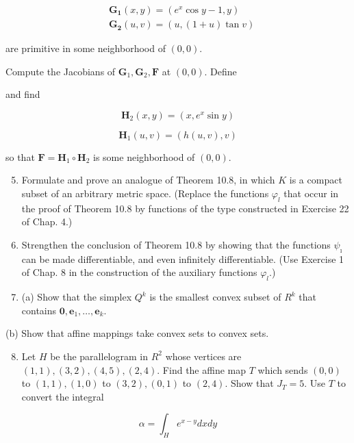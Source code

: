 \documentclass[10pt]{article}
\begin{document}
$$
\begin{aligned}
& \mathbf{G}_{\mathbf{1}}(x, y)=\left(e^{x} \cos y-1, y\right) \\
& \mathbf{G}_{\mathbf{2}}(u, v)=(u,(1+u) \tan v)
\end{aligned}
$$

are primitive in some neighborhood of $(0,0)$.

Compute the Jacobians of $\mathbf{G}_{1}, \mathbf{G}_{2}, \mathbf{F}$ at $(0,0)$. Define

and find

$$
\mathbf{H}_{2}(x, y)=\left(x, e^{x} \sin y\right)
$$

$$
\mathbf{H}_{1}(u, v)=(h(u, v), v)
$$

so that $\mathbf{F}=\mathbf{H}_{1} \circ \mathbf{H}_{2}$ is some neighborhood of $(0,0)$.

\begin{enumerate}
  \setcounter{enumi}{4}
  \item Formulate and prove an analogue of Theorem 10.8, in which $K$ is a compact subset of an arbitrary metric space. (Replace the functions $\varphi_{l}$ that occur in the proof of Theorem 10.8 by functions of the type constructed in Exercise 22 of Chap. 4.)

  \item Strengthen the conclusion of Theorem 10.8 by showing that the functions $\psi_{\imath}$ can be made differentiable, and even infinitely differentiable. (Use Exercise 1 of Chap. 8 in the construction of the auxiliary functions $\varphi_{l}$.)

  \item (a) Show that the simplex $Q^{k}$ is the smallest convex subset of $R^{k}$ that contains $\mathbf{0}, \mathbf{e}_{1}, \ldots, \mathbf{e}_{k}$.

\end{enumerate}

(b) Show that affine mappings take convex sets to convex sets.

\begin{enumerate}
  \setcounter{enumi}{7}
  \item Let $H$ be the parallelogram in $R^{2}$ whose vertices are $(1,1),(3,2),(4,5),(2,4)$. Find the affine map $T$ which sends $(0,0)$ to $(1,1),(1,0)$ to $(3,2),(0,1)$ to $(2,4)$. Show that $J_{T}=5$. Use $T$ to convert the integral
\end{enumerate}

$$
\alpha=\int_{H} e^{x-y} d x d y
$$
\end{document}
